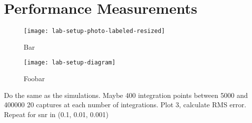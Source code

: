 \section{Performance Measurements}

\begin{figure}
  \centering
  \texttt{[image: lab-setup-photo-labeled-resized]}
  \caption{Bar}
\end{figure}
\begin{figure}
  \centering
  \texttt{[image: lab-setup-diagram]}
  \caption{Foobar}
\end{figure}

Do the same as the simulations.
Maybe 400 integration points between 5000 and 400000
20 captures at each number of integrations.
Plot 3, calculate RMS error.
Repeat for snr in (0.1, 0.01, 0.001)
